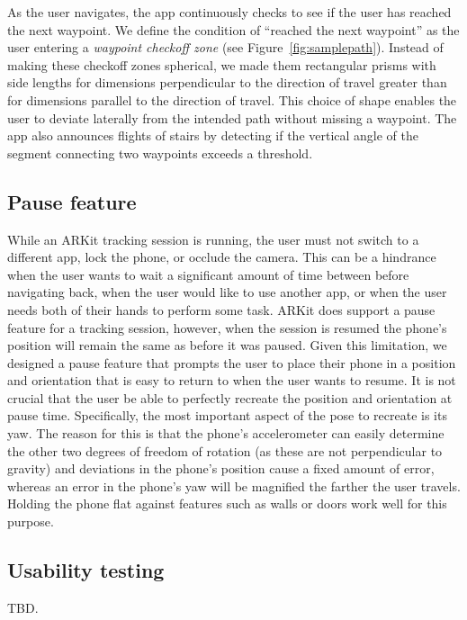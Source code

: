\documentclass[chi_draft]{sigchi}
\begin{document}
As the user navigates, the app continuously checks to see if the user has reached the next waypoint.  We define the condition of ``reached the next waypoint'' as the user entering a \emph{waypoint checkoff zone} (see Figure~\ref{fig:samplepath}).  Instead of making these checkoff zones spherical, we made them rectangular prisms with side lengths for dimensions perpendicular to the direction of travel greater than for dimensions parallel to the direction of travel.  This choice of shape enables the user to deviate laterally from the intended path without missing a waypoint.  The app also announces flights of stairs by detecting if the vertical angle of the segment connecting two waypoints exceeds a threshold.

\subsection{Pause feature}
While an ARKit tracking session is running, the user must not switch to a different app, lock the phone, or occlude the camera.  This can be a hindrance when the user wants to wait a significant amount of time between before navigating back, when the user would like to use another app, or when the user needs both of their hands to perform some task.  ARKit does support a pause feature for a tracking session, however, when the session is resumed the phone's position will remain the same as before it was paused.  Given this limitation, we designed a pause feature that prompts the user to place their phone in a position and orientation that is easy to return to when the user wants to resume.  It is not crucial that the user be able to perfectly recreate the position and orientation at pause time.  Specifically, the most important aspect of the pose to recreate is its yaw.  The reason for this is that the phone's accelerometer can easily determine the other two degrees of freedom of rotation (as these are not perpendicular to gravity) and deviations in the phone's position cause a fixed amount of error, whereas an error in the phone's yaw will be magnified the farther the user travels.  Holding the phone flat against features such as walls or doors work well for this purpose.  

\subsection{Usability testing}
TBD.
\end{document}
